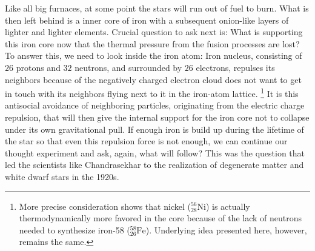 Like all big furnaces, at some point the stars will run out of fuel to burn.
What is then left behind is a inner core of iron with a subsequent onion-like layers of lighter and lighter elements.
Crucial question to ask next is: 
What is supporting this iron core now that the thermal pressure from the fusion processes are lost?
To answer this, we need to look inside the iron atom:
Iron nucleus, consisting of $26$ protons and $32$ neutrons, and surrounded by $26$ electrons, repulses its neighbors because of the negatively charged electron cloud does not want to get in touch with its neighbors flying next to it in the iron-atom lattice.
\footnote{More precise consideration shows that nickel ($^{56}_{28}\mathrm{Ni}$) is actually thermodynamically more favored in the core because of the lack of neutrons needed to synthesize iron-58 ($^{58}_{26}\mathrm{Fe}$).
Underlying idea presented here, however, remains the same.
}
It is this antisocial avoidance of neighboring particles, originating from the electric charge repulsion, that will then give the internal support for the iron core not to collapse under its own gravitational pull.
If enough iron is build up during the lifetime of the star so that even this repulsion force is not enough, we can continue our thought experiment and ask, again, what will follow?
This was the question that led the scientists like Chandrasekhar to the realization of degenerate matter and white dwarf stars in the 1920s.

